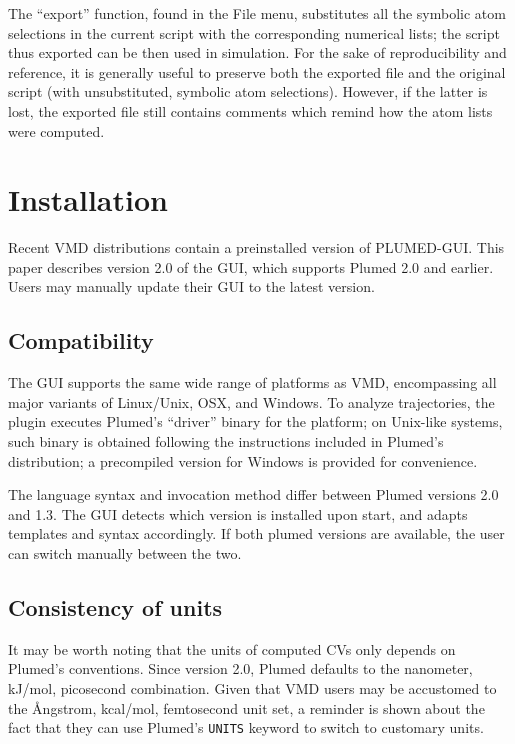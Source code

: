 \documentclass[preprint,12pt]{elsarticle}
\begin{document}
The ``export'' function, found in the File menu,  substitutes all the
symbolic atom selections in the current script with the corresponding
numerical lists; the script thus exported can be then used in
simulation.  For the sake of reproducibility and reference, it is
generally useful to preserve both the exported file and the original
script (with unsubstituted, symbolic atom selections). However, if the
latter is lost, the exported file still contains comments which remind
how the atom lists were computed.




\section{Installation}

Recent VMD distributions contain a preinstalled version of PLUMED-GUI.
This paper describes version 2.0 of the GUI, which supports Plumed 2.0
and earlier.  Users may manually update their GUI to the latest
version.



\subsection{Compatibility} 

The GUI supports the same wide range of platforms as VMD, encompassing
all major variants of Linux/Unix, OSX, and Windows. To analyze
trajectories, the plugin executes Plumed's ``driver'' binary for the
platform; on Unix-like systems, such binary is obtained following the
instructions included in Plumed's distribution; a precompiled version
for Windows is provided for convenience.

The language syntax and invocation method differ between Plumed
versions 2.0 and 1.3.  The GUI detects which version is installed upon
start, and adapts templates and syntax accordingly.  If both plumed
versions are available, the user can switch manually between the two.


\subsection{Consistency of units}

It may be worth noting that the units of computed CVs only depends on
Plumed's conventions.  Since version 2.0, Plumed defaults to the
nanometer, kJ/mol, picosecond combination. Given that VMD users
may be accustomed to the \AA ngstrom, kcal/mol, femtosecond unit
set, a reminder is shown about the fact that they can use Plumed's
\texttt{UNITS} keyword to switch to customary units.
\end{document}
